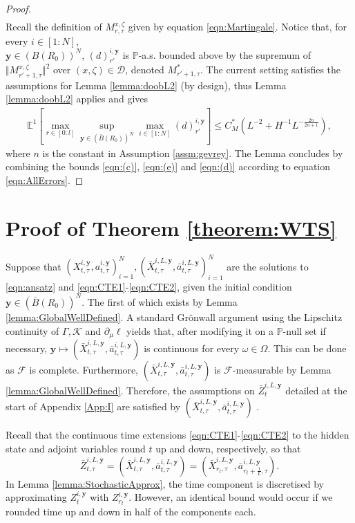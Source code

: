 \documentclass{article}
\begin{document}
\begin{appendices}
\begin{proof}
\begin{align}
 \end{align} 
 Recall the definition of $M^{x,\zeta}_{r,\tau}$ given by equation \eqref{eqn:Martingale}. Notice that, for every $i\in[1:N]$, \\$\bm{y}\in(B(R_0))^N$, $(d)^{i,\bm{y}}_{r'}$ is $\mathbb P$-a.s. bounded above by the supremum of $\Vert M^{x,\zeta}_{r'+1,\tau}\Vert^2$ over $(x,\zeta )\in \mathscr D$, denoted $M^{*}_{r'+1,\tau}$.
The current setting satisfies the assumptions for Lemma \ref{lemma:doobL2} (by design), thus Lemma \ref{lemma:doobL2} applies and gives
\begin{align}\label{eqn:(d)}
    \mathbb E^1 \left[\max_{r\in[0:l]}\sup_{\bm{y}\in (\bar B(R_0))^N}\max_{i\in[1:N]}(d)^{i,\bm{y}}_{r'}\right] \le C_M^* \left( L^{-2}+ H^{-1}L^{-\frac{2n}{2n+1}}\right),
\end{align}
where $n$ is the constant in Assumption \ref{assm:gevrey}. The Lemma concludes by combining the bounds \eqref{eqn:(c)}, \eqref{eqn:(e)} and \eqref{eqn:(d)} according to equation \eqref{eqn:AllErrors}.
\end{proof}
\section{Proof of Theorem \ref{theorem:WTS}}\label{app:J}
Suppose that $(X^{i,\bm{y}}_{t,\tau},a^{i,\bm{y}}_{t,\tau})_{i=1}^N,(\bar X^{i,L,\bm{y}}_{t,\tau},\bar a^{i,L,\bm{y}}_{t,\tau})_{i=1}^N$ are the solutions to \eqref{eqn:ansatz} and  \eqref{eqn:CTE1}-\eqref{eqn:CTE2}, given the initial condition $\bm y\in (\bar B(R_0))^N$. The first of which exists by Lemma \ref{lemma:GlobalWellDefined}. A standard Gr\"onwall argument using the Lipschitz continuity of $\Gamma,\mathcal K$ and $\partial_\mu\ell$ yields that, after modifying it on a $\mathbb P$-null set if necessary, $\bm{y}\mapsto (\bar X^{i,L,\bm{y}}_{t,\tau},\bar a^{i,L,\bm{y}}_{t,\tau})$ is continuous for every $\omega\in \Omega$. This can be done as $\mathcal F$ is complete. Furthermore, $(\bar X^{i,L,\bm{y}}_{t,\tau},\bar a^{i,L,\bm{y}}_{t,\tau})$ is $\mathcal F$-measurable by Lemma \ref{lemma:GlobalWellDefined}. Therefore, the assumptions on $\bar Z^{i,L,\bm{y}}_{t}$ detailed at the start of Appendix \ref{App:I} are satisfied by $(\bar X^{i,L,\bm{y}}_{t,\tau},\bar a^{i,L,\bm{y}}_{t,\tau})$ .

Recall that the continuous time extensions \eqref{eqn:CTE1}-\eqref{eqn:CTE2} to the hidden state and adjoint variables round $t$ up and down, respectively, so that
\[
\bar Z^{i,L,\bm{y}}_{t,\tau} = (\bar X^{i,L,\bm{y}}_{t,\tau},\bar a^{i,L,\bm{y}}_{t,\tau}) = (\bar X^{i,L,\bm{y}}_{r_t,\tau},\bar a^{i,L,\bm{y}}_{r_t+\frac{1}{L},\tau}).
\]
In Lemma \ref{lemma:StochasticApprox}, the time component is discretised by approximating $Z^{i,\bm{y}}_t$ with $Z^{i,\bm{y}}_{r_t}$. However, an identical bound would occur if we rounded time up and down in half of the components each.


\end{appendices}
\end{document}
